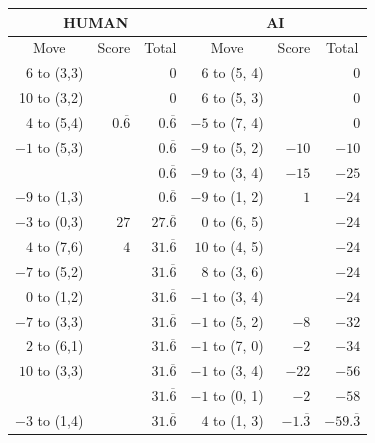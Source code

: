 \begin{appendices}
\begin{table}[H]
    \centering
    \begin{tabular}{rrrrrr}
        \hline
        \multicolumn{3}{c}{HUMAN}        & \multicolumn{3}{c}{AI}     \\ \hline
        \multicolumn{1}{c}{Move}         & \multicolumn{1}{c}{Score} & \multicolumn{1}{c}{Total} & \multicolumn{1}{c}{Move}         & \multicolumn{1}{c}{Score} & \multicolumn{1}{c}{Total} \\ \hline
          6 to (3,3) &       &  0    &   6 to (5, 4) &       &  0    \\ \hline
          10 to (3,2) &       &  0    &   6 to (5, 3) &       &  0    \\ \hline
          4 to (5,4) & $0.\overline6$ &  $0.\overline6$    &   $-5$ to (7, 4) &       &  0    \\ \hline
          $-1$ to (5,3) &             &  $0.\overline6$    &   $-9$ to (5, 2) & $-10$       &  $-10$    \\ \hline
                        &             &  $0.\overline6$    &   $-9$ to (3, 4) & $-15$       &  $-25$    \\ \hline
          $-9$ to (1,3) &             &  $0.\overline6$    &   $-9$ to (1, 2) & $1$       &  $-24$    \\ \hline
          $-3$ to (0,3) & $27$        &  $27.\overline6$    &   $0$ to (6, 5) &           &  $-24$    \\ \hline
          $4$ to (7,6)  & $4$        &  $31.\overline6$     &   $10$ to (4, 5) &           &  $-24$    \\ \hline
          $-7$ to (5,2)  &          &  $31.\overline6$     &   $8$ to (3, 6) &           &  $-24$    \\ \hline
          $0$ to (1,2)  &           &  $31.\overline6$     &   $-1$ to (3, 4) &           &  $-24$    \\ \hline
          $-7$ to (3,3)  &           &  $31.\overline6$     &   $-1$ to (5, 2) & $-8$           &  $-32$    \\ \hline
          $2$ to (6,1)  &           &  $31.\overline6$     &   $-1$ to (7, 0) & $-2$           &  $-34$    \\ \hline
          $10$ to (3,3)  &          &  $31.\overline6$     &   $-1$ to (3, 4) & $-22$           &  $-56$    \\ \hline
                         &          &  $31.\overline6$     &   $-1$ to (0, 1) & $-2$           &  $-58$    \\ \hline
          $-3$ to (1,4)  &          &  $31.\overline6$     &   $4$ to (1, 3) & $-1.\overline3$    &  $-59.\overline3$    \\ \hline

\end{tabular}
\end{table}
\end{appendices}
